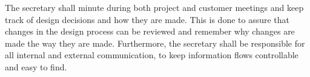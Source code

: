	The secretary shall minute during both project and customer meetings and keep track of design decisions and how they are made. This is done to assure that changes in the design process can be reviewed and remember why changes are made the way they are made. Furthermore, the secretary shall be responsible for all internal and external communication, to keep information flows controllable and easy to find.